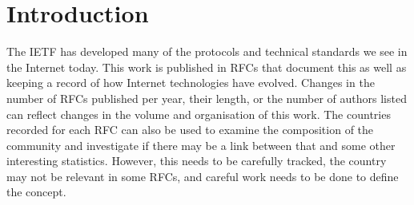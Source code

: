 \documentclass{l4proj}
\begin{document}
\tableofcontents

%
%
%

%
%
%
%
\chapter{Introduction}


The IETF has developed many of the protocols and technical standards we see in the Internet today. This work is published in RFCs that document this as well as keeping a record of how Internet technologies have evolved. Changes in the number of RFCs published per year, their length, or the number of authors listed can reflect changes in the volume and organisation of this work. The countries recorded for each RFC can also be used to examine the composition of the community and investigate if there may be a link between that and some other interesting statistics. However, this needs to be carefully tracked, the country may not be relevant in some RFCs, and careful work needs to be done to define the concept.
\end{document}
